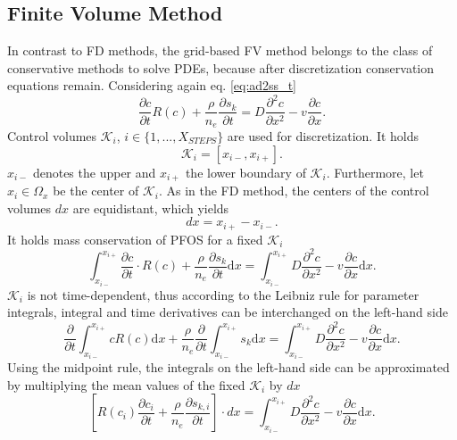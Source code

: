 \subsection{Finite Volume Method}
In contrast to FD methods, the grid-based FV method belongs to the class of conservative methods to solve PDEs, because after discretization conservation equations remain. Considering again eq. \ref{eq:ad2ss_t}
\begin{equation}
        \frac{\partial c}{\partial t} R(c) + \frac{\rho}{n_e} \frac{\partial s_k}{\partial t} = D \frac{\partial^2c}{\partial x^2} - v\frac{\partial c}{\partial x}.
\end{equation}
Control volumes $\mathcal{K}_i$, $i \in \{1, ... , X_{STEPS}\}$ are used for discretization. It holds
\begin{equation}
    \mathcal{K}_i = \left[x_{i-},x_{i+}\right].
\end{equation}
$x_{i-}$ denotes the upper and $x_{i+}$ the lower boundary of $\mathcal{K}_i$. Furthermore, let $x_i \in \Omega_x$ be the center of $\mathcal{K}_i$. As in the FD method, the centers of the control volumes $dx$ are equidistant, which yields
\begin{equation}
dx = x_{i+} - x_{i-}.
\end{equation}
It holds mass conservation of PFOS for a fixed $\mathcal{K}_i$
\begin{equation}
    \int_{x_{i-}}^{x_{i+}} \frac{\partial c}{\partial t} \cdot R(c) + \frac{\rho}{n_e} \frac{\partial s_k}{\partial t} \mathrm{d}x = \int_{x_{i-}}^{x_{i+}} D \frac{\partial^2c}{\partial x^2} - v\frac{\partial c}{\partial x} \mathrm{d}x.
\end{equation}
$\mathcal{K}_i$ is not time-dependent, thus according to the Leibniz rule for parameter integrals, integral and time derivatives can be interchanged on the left-hand side
\begin{equation}
    \frac{\partial }{\partial t} \int_{x_{i-}}^{x_{i+}}  c R(c)\mathrm{d}x  + \frac{\rho}{n_e} \frac{\partial}{\partial t} \int_{x_{i-}}^{x_{i+}} s_k \mathrm{d}x = \int_{x_{i-}}^{x_{i+}} D \frac{\partial^2c}{\partial x^2} - v\frac{\partial c}{\partial x} \mathrm{d}x.
\end{equation}
Using the midpoint rule, the integrals on the left-hand side can be approximated by multiplying the mean values of the fixed $\mathcal{K}_i$ by $dx$
\begin{equation}
    \left[R(c_i)\frac{\partial c_i}{\partial t}  + \frac{\rho}{n_e} \frac{\partial s_{k,i}}{\partial t}\right] \cdot dx = \int_{x_{i-}}^{x_{i+}} D \frac{\partial^2c}{\partial x^2} - v\frac{\partial c}{\partial x} \mathrm{d}x.
    \label{eq:FV_1}
\end{equation}
